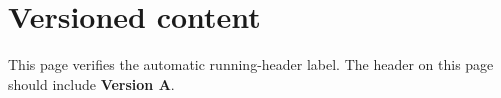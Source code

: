 \documentclass[teacher]{physicsquiz}
\begin{document}
\makequiztitle
\section*{Versioned content}
This page verifies the automatic running-header label.
\newpage
The header on this page should include \textbf{Version A}.
\end{document}
